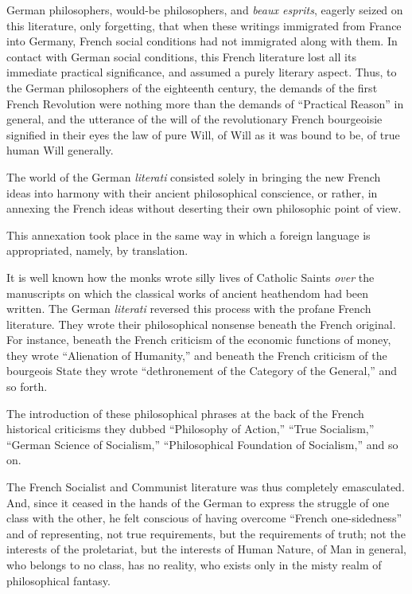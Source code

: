 German philosophers, would-be philosophers, and \textit{beaux esprits},
eagerly seized on this literature, only forgetting, that when these
writings immigrated from France into Germany, French social conditions
had not immigrated along with them. In contact with German social
conditions, this French literature lost all its immediate practical
significance, and assumed a purely literary aspect. Thus, to the German
philosophers of the eighteenth century, the demands of the first French
Revolution were nothing more than the demands of \enquote{Practical Reason} in
general, and the utterance of the will of the revolutionary French
bourgeoisie signified in their eyes the law of pure Will, of Will as it
was bound to be, of true human Will generally.

The world of the German \textit{literati} consisted solely in bringing the new
French ideas into harmony with their ancient philosophical conscience,
or rather, in annexing the French ideas without deserting their own
philosophic point of view.

This annexation took place in the same way in which a foreign language
is appropriated, namely, by translation.

It is well known how the monks wrote silly lives of Catholic Saints
\textit{over} the manuscripts on which the classical works of ancient
heathendom had been written. The German \textit{literati} reversed this
process with the profane French literature. They wrote their
philosophical nonsense beneath the French original. For instance,
beneath the French criticism of the economic functions of money, they
wrote \enquote{Alienation of Humanity,} and beneath the French criticism of the
bourgeois State they wrote \enquote{dethronement of the Category of the
General,} and so forth.

The introduction of these philosophical phrases at the back of the
French historical criticisms they dubbed \enquote{Philosophy of Action,} \enquote{True
Socialism,} \enquote{German Science of Socialism,} \enquote{Philosophical Foundation of
Socialism,} and so on.

The French Socialist and Communist literature was thus completely
emasculated. And, since it ceased in the hands of the German to express
the struggle of one class with the other, he felt conscious of having
overcome \enquote{French one-sidedness} and of representing, not true
requirements, but the requirements of truth; not the interests of the
proletariat, but the interests of Human Nature, of Man in general, who
belongs to no class, has no reality, who exists only in the misty realm
of philosophical fantasy.

